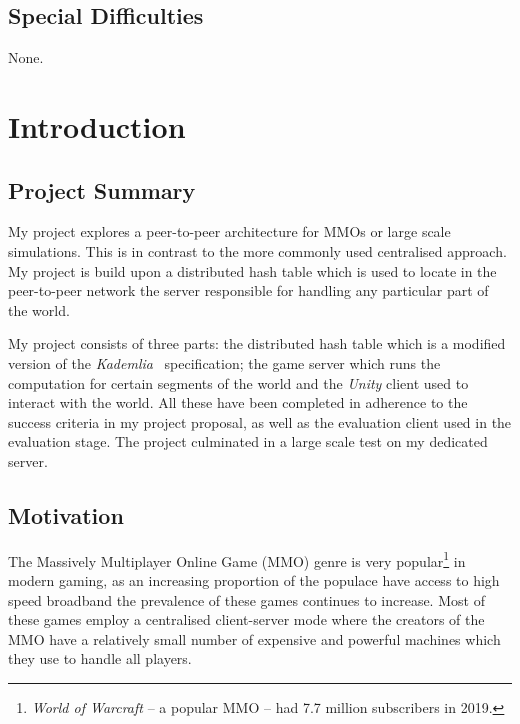 \documentclass[12pt,notitlepage,a4paper]{report}
\newcommand{\unity}{\emph{Unity}}
\newcommand{\kademlia}{\emph{Kademlia}}
\begin{document}
	\section*{Special Difficulties}
	None.
	
	\tableofcontents
	
	\listoffigures
	
	\listoftables
	
	\listofalgorithms
	
	\newpage

	\clearpage
	
	\setcounter{page}{1}
	\pagestyle{headings}
	\chapter{Introduction}
	
	\section{Project Summary}
	My project explores a peer-to-peer architecture for MMOs or large scale simulations. This is in contrast to the more commonly used centralised approach. My project is build upon a distributed hash table which is used to locate in the peer-to-peer network the server responsible for handling any particular part of the world.
	
	My project consists of three parts: the distributed hash table which is a modified version of the \kademlia{}~\cite{kademlia} specification; the game server which runs the computation for certain segments of the world and the \unity{} client used to interact with the world. All these have been completed in adherence to the success criteria in my project proposal, as well as the evaluation client used in the evaluation stage. The project culminated in a large scale test on my dedicated server.
	
	\section{Motivation}
	The Massively Multiplayer Online Game (MMO) genre is very popular\footnote{\emph{World of Warcraft} -- a popular MMO -- had 7.7 million subscribers in 2019.} in modern gaming, as an increasing proportion of the populace have access to high speed broadband the prevalence of these games continues to increase. Most of these games employ a centralised client-server mode where the creators of the MMO have a relatively small number of expensive and powerful machines which they use to handle all players.
	
\end{document}
